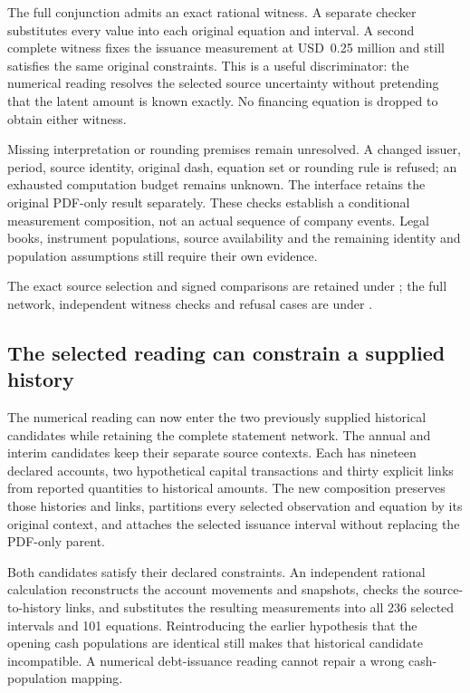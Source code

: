 The full conjunction admits an exact rational witness. A separate checker
substitutes every value into each original equation and interval. A second
complete witness fixes the issuance measurement at USD~0.25 million and
still satisfies the same original constraints. This is a useful discriminator:
the numerical reading resolves the selected source uncertainty without
pretending that the latent amount is known exactly. No financing equation is
dropped to obtain either witness.

Missing interpretation or rounding premises remain unresolved. A changed
issuer, period, source identity, original dash, equation set or rounding rule
is refused; an exhausted computation budget remains unknown. The interface
retains the original PDF-only result separately. These checks establish a
conditional measurement composition, not an actual sequence of company events.
Legal books, instrument populations, source availability and the remaining
identity and population assumptions still require their own evidence.

The exact source selection and signed comparisons are retained under
; the full network,
independent witness checks and refusal cases are under
.

\subsection{The selected reading can constrain a supplied history}
\label{sec:selected-reading-history}

The numerical reading can now enter the two previously supplied historical
candidates while retaining the complete statement network. The annual and
interim candidates keep their separate source contexts. Each has nineteen
declared accounts, two hypothetical capital transactions and thirty explicit
links from reported quantities to historical amounts. The new composition
preserves those histories and links, partitions every selected observation
and equation by its original context, and attaches the selected issuance
interval without replacing the PDF-only parent.

Both candidates satisfy their declared constraints. An independent rational
calculation reconstructs the account movements and snapshots, checks the
source-to-history links, and substitutes the resulting measurements into all
236 selected intervals and 101 equations. Reintroducing the earlier hypothesis
that the opening cash populations are identical still makes that historical
candidate incompatible. A numerical debt-issuance reading cannot repair a
wrong cash-population mapping.

